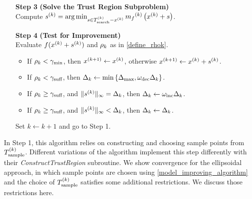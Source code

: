 {\begin{fullwidth}[leftmargin=0in, rightmargin=0in, width=\linewidth-0.25in]
\begin{flushleft}
\begin{algorithm}[H]
\begin{itemize}
        
        \item[\textbf{Step 3}] \textbf{(Solve the Trust Region Subproblem)} \\
            Compute ${{s}^{(k)}} = \operatorname*{arg\,min}_{s \in {T_{\text{search}}^{(k)}} - x^{(k)}} {{m}_f}^{(k)}\left(x^{(k)} + s\right)$. 
            
 		\end{itemize}
 		\end{algorithm}
 		
 		\newpage
 		
 		\begin{algorithm}[H]
 		\begin{itemize}
        \item[\textbf{Step 4}] \textbf{(Test for Improvement)} \\
            Evaluate $f(x^{(k)} + {{s}^{(k)}})$ and $\rho_k$ as in \cref{define_rhok}.
            \begin{itemize}
            	\item If $\rho_k < \gamma_{\textrm{min}}$, then ${{x}^{(k+1)}} \gets x^{(k)}$, otherwise ${{x}^{(k+1)}} \gets x^{(k)} + {{s}^{(k)}}$.
            	\item If $\rho_k < \gamma_{\textrm{suff}}$, then $\Delta_k \gets \min\left\{{\Delta_{\textrm{max}}}, \omega_{\text{dec}}\Delta_k\right\}$.
            	\item If $\rho_k \ge \gamma_{\textrm{suff}}$, and $\|{{s}^{(k)}}\|_{\infty} = \Delta_k$, then $\Delta_k \gets \omega_{\text{inc}}\Delta_k$.
            	\item If $\rho_k \ge \gamma_{\textrm{suff}}$, and $\|{{s}^{(k)}}\|_{\infty} < \Delta_k$, then $\Delta_k \gets \Delta_k$.
            \end{itemize}
            Set $k \gets k+1$ and go to Step 1.
    \end{itemize}
\end{algorithm}

\end{flushleft}
\end{fullwidth}
}


In Step 1, this algorithm relies on constructing and choosing sample points from ${T_{\text{sample}}^{(k)}}$.
Different variations of the algorithm implement this step differently with their \emph{ConstructTrustRegion} subroutine.
We show convergence for the ellipsoidal approach, in which sample points are chosen using \cref{model_improving_algorithm}
and the choice of ${T_{\text{sample}}^{(k)}}$ satisfies some additional restrictions.
We discuss those restrictions here.

